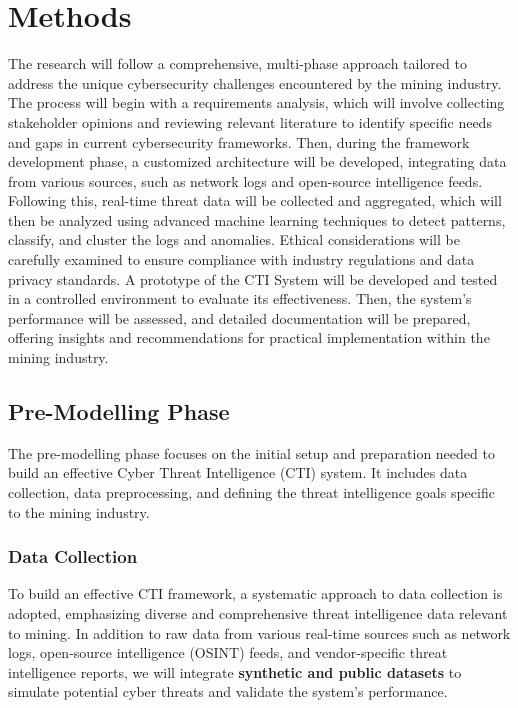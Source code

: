 \documentclass[a4paper,twoside,12pt]{report}
\begin{document}
\section{Methods} \label{sec:phases}
The research will follow a comprehensive, multi-phase approach tailored to address the unique cybersecurity challenges encountered by the mining industry. The process will begin with a requirements analysis, which will involve collecting stakeholder opinions and reviewing relevant literature to identify specific needs and gaps in current cybersecurity frameworks. Then, during the framework development phase, a customized architecture will be developed, integrating data from various sources, such as network logs and open-source intelligence feeds. Following this, real-time threat data will be collected and aggregated, which will then be analyzed using advanced machine learning techniques to detect patterns, classify, and cluster the logs and anomalies. Ethical considerations will be carefully examined to ensure compliance with industry regulations and data privacy standards. A prototype of the CTI System will be developed and tested in a controlled environment to evaluate its effectiveness. Then, the system’s performance will be assessed, and detailed documentation will be prepared, offering insights and recommendations for practical implementation within the mining industry.

\subsection{Pre-Modelling Phase} 
The pre-modelling phase focuses on the initial setup and preparation needed to build an effective Cyber Threat Intelligence (CTI) system. It includes data collection, data preprocessing, and defining the threat intelligence goals specific to the mining industry.

\subsubsection{Data Collection}
To build an effective CTI framework, a systematic approach to data collection is adopted, emphasizing diverse and comprehensive threat intelligence data relevant to mining. In addition to raw data from various real-time sources such as network logs, open-source intelligence (OSINT) feeds, and vendor-specific threat intelligence reports, we will integrate \textbf{synthetic and public datasets} to simulate potential cyber threats and validate the system's performance.
\end{document}
